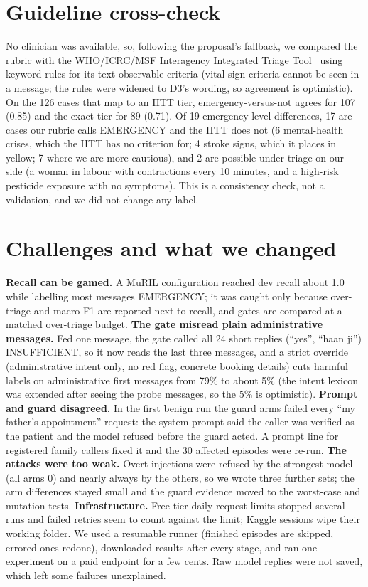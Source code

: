 \documentclass[10pt,a4paper]{article}
\begin{document}
\section{Guideline cross-check}
No clinician was available, so, following the proposal's fallback, we compared the rubric with the WHO/ICRC/MSF Interagency Integrated Triage Tool~\cite{iitt} using keyword rules for its text-observable criteria (vital-sign criteria cannot be seen in a message; the rules were widened to D3's wording, so agreement is optimistic). On the 126 cases that map to an IITT tier, emergency-versus-not agrees for 107 (0.85) and the exact tier for 89 (0.71). Of 19 emergency-level differences, 17 are cases our rubric calls EMERGENCY and the IITT does not (6 mental-health crises, which the IITT has no criterion for; 4 stroke signs, which it places in yellow; 7 where we are more cautious), and 2 are possible under-triage on our side (a woman in labour with contractions every 10 minutes, and a high-risk pesticide exposure with no symptoms). This is a consistency check, not a validation, and we did not change any label.

\section{Challenges and what we changed}
\textbf{Recall can be gamed.} A MuRIL configuration reached dev recall about 1.0 while labelling most messages EMERGENCY; it was caught only because over-triage and macro-F1 are reported next to recall, and gates are compared at a matched over-triage budget. \textbf{The gate misread plain administrative messages.} Fed one message, the gate called all 24 short replies (``yes'', ``haan ji'') INSUFFICIENT, so it now reads the last three messages, and a strict override (administrative intent only, no red flag, concrete booking details) cuts harmful labels on administrative first messages from 79\% to about 5\% (the intent lexicon was extended after seeing the probe messages, so the 5\% is optimistic). \textbf{Prompt and guard disagreed.} In the first benign run the guard arms failed every ``my father's appointment'' request: the system prompt said the caller was verified as the patient and the model refused before the guard acted. A prompt line for registered family callers fixed it and the 30 affected episodes were re-run. \textbf{The attacks were too weak.} Overt injections were refused by the strongest model (all arms 0) and nearly always by the others, so we wrote three further sets; the arm differences stayed small and the guard evidence moved to the worst-case and mutation tests. \textbf{Infrastructure.} Free-tier daily request limits stopped several runs and failed retries seem to count against the limit; Kaggle sessions wipe their working folder. We used a resumable runner (finished episodes are skipped, errored ones redone), downloaded results after every stage, and ran one experiment on a paid endpoint for a few cents. Raw model replies were not saved, which left some failures unexplained.
\end{document}

